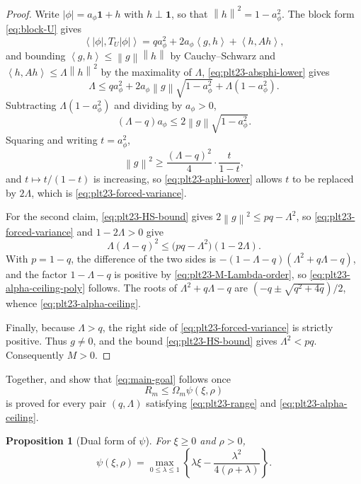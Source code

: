 \documentclass[11pt]{article}
\newtheorem{proposition}[theorem]{Proposition}
\numberwithin{equation}{section}
\newcommand{\one}{\mathbf 1}
\newcommand{\ip}[2]{\left\langle #1,#2\right\rangle}
\newcommand{\norm}[1]{\left\lVert #1\right\rVert}
\begin{document}
\begin{proof}
  Write $|\phi|=a_\phi\one+h$ with $h\perp\one$, so that
  $\norm h^2=1-a_\phi^2$.  The block form \eqref{eq:block-U} gives
  \[
    \ip{|\phi|}{T_U|\phi|}
    =qa_\phi^2+2a_\phi\ip gh+\ip h{Ah},
  \]
  and bounding $\ip gh\le\norm g\norm h$ by Cauchy--Schwarz and
  $\ip h{Ah}\le\Lambda\norm h^2$ by the maximality of $\Lambda$,
  \eqref{eq:plt23-absphi-lower} gives
  \[
    \Lambda\le qa_\phi^2+2a_\phi\norm g\sqrt{1-a_\phi^2}
    +\Lambda(1-a_\phi^2).
  \]
  Subtracting $\Lambda(1-a_\phi^2)$ and dividing by $a_\phi>0$,
  \[
    (\Lambda-q)a_\phi
    \le2\norm g\sqrt{1-a_\phi^2}.
  \]
  Squaring and writing $t=a_\phi^2$,
  \[
    \norm g^2\ge\frac{(\Lambda-q)^2}{4}\cdot\frac{t}{1-t},
  \]
  and $t\mapsto t/(1-t)$ is increasing, so \eqref{eq:plt23-aphi-lower} allows $t$ to
  be replaced by $2\Lambda$, which is \eqref{eq:plt23-forced-variance}.

  For the second claim, \eqref{eq:plt23-HS-bound} gives
  $2\norm g^2\le pq-\Lambda^2$, so \eqref{eq:plt23-forced-variance} and
  $1-2\Lambda>0$ give
  \[
    \Lambda(\Lambda-q)^2\le\bigl(pq-\Lambda^2\bigr)(1-2\Lambda).
  \]
  With $p=1-q$, the difference of the two sides is
  $-(1-\Lambda-q)(\Lambda^2+q\Lambda-q)$, and the factor $1-\Lambda-q$ is
  positive by \eqref{eq:plt23-M-Lambda-order}, so \eqref{eq:plt23-alpha-ceiling-poly} follows.
  The roots of $\Lambda^2+q\Lambda-q$ are $(-q\pm\sqrt{q^2+4q})/2$, whence
  \eqref{eq:plt23-alpha-ceiling}.

  Finally, because $\Lambda>q$, the right side of \eqref{eq:plt23-forced-variance}
  is strictly positive.  Thus $g\ne0$, and the bound \eqref{eq:plt23-HS-bound}
  gives $\Lambda^2<pq$.  Consequently $M>0$.
\end{proof}

Together,  and  show that
\eqref{eq:main-goal} follows once
\begin{equation}\label{eq:plt23-scalar-target}
  R_m\le \Omega_m\psi(\xi,\rho)
\end{equation}
is proved for every pair $(q,\Lambda)$ satisfying \eqref{eq:plt23-range} and
\eqref{eq:plt23-alpha-ceiling}.

\begin{proposition}[Dual form of $\psi$]\label{prop:plt23-huber-dual}
  For $\xi\ge0$ and $\rho>0$,
  \begin{equation}\label{eq:plt23-psi-dual}
    \psi(\xi,\rho)=
    \max_{0\le\lambda\le1}
    \left\{
    \lambda\xi-\frac{\lambda^2}{4(\rho+\lambda)}
    \right\}.
  \end{equation}
\end{proposition}
\end{document}
